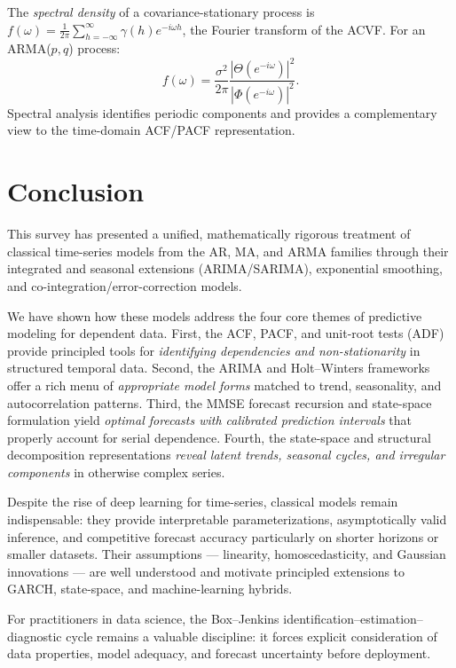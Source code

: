 \documentclass[conference]{IEEEtran}
\theoremstyle{definition}
\begin{document}
The \emph{spectral density} of a covariance-stationary process is
$f(\omega) = \frac{1}{2\pi}\sum_{h=-\infty}^{\infty}\gamma(h)e^{-i\omega h}$,
the Fourier transform of the ACVF. For an ARMA($p,q$) process:
\begin{equation}
  f(\omega) = \frac{\sigma^2}{2\pi}
              \frac{|\Theta(e^{-i\omega})|^2}{|\Phi(e^{-i\omega})|^2}.
  \label{eq:spectral}
\end{equation}
Spectral analysis identifies periodic components and provides a
complementary view to the time-domain ACF/PACF representation.

\section{Conclusion}
\label{sec:conclusion}

This survey has presented a unified, mathematically rigorous treatment of
classical time-series models from the AR, MA, and ARMA families through
their integrated and seasonal extensions (ARIMA/SARIMA), exponential
smoothing, and co-integration/error-correction models.

We have shown how these models address the four core themes of predictive
modeling for dependent data. First, the ACF, PACF, and unit-root tests
(ADF) provide principled tools for \emph{identifying dependencies and
non-stationarity} in structured temporal data. Second, the ARIMA and
Holt--Winters frameworks offer a rich menu of \emph{appropriate model forms}
matched to trend, seasonality, and autocorrelation patterns. Third, the MMSE
forecast recursion and state-space formulation yield \emph{optimal forecasts
with calibrated prediction intervals} that properly account for serial
dependence. Fourth, the state-space and structural decomposition
representations \emph{reveal latent trends, seasonal cycles, and irregular
components} in otherwise complex series.

Despite the rise of deep learning for time-series, classical models remain
indispensable: they provide interpretable parameterizations, asymptotically
valid inference, and competitive forecast accuracy particularly on shorter
horizons or smaller datasets. Their assumptions --- linearity, homoscedasticity,
and Gaussian innovations --- are well understood and motivate principled
extensions to GARCH, state-space, and machine-learning hybrids.

For practitioners in data science, the Box--Jenkins identification--estimation--%
diagnostic cycle remains a valuable discipline: it forces explicit
consideration of data properties, model adequacy, and forecast uncertainty
before deployment.
\end{document}
